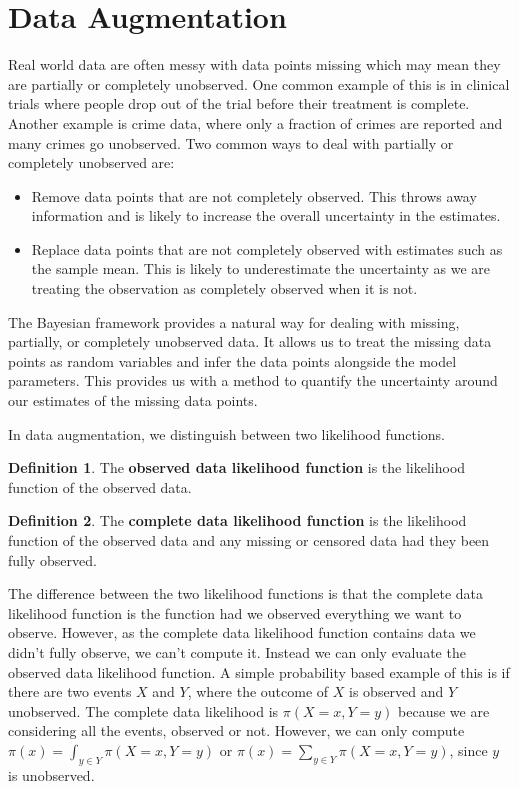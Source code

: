 \documentclass[
]{book}
\providecommand{\tightlist}{%
  \setlength{\itemsep}{0pt}\setlength{\parskip}{0pt}}
\theoremstyle{definition}
\newtheorem{definition}{Definition}[chapter]
\theoremstyle{definition}
\theoremstyle{definition}
\theoremstyle{definition}
\theoremstyle{remark}
\begin{document}
\section{Data Augmentation}\label{data-augmentation}

Real world data are often messy with data points missing which may mean they are partially or completely unobserved. One common example of this is in clinical trials where people drop out of the trial before their treatment is complete. Another example is crime data, where only a fraction of crimes are reported and many crimes go unobserved. Two common ways to deal with partially or completely unobserved are:

\begin{itemize}
\tightlist
\item
  Remove data points that are not completely observed. This throws away information and is likely to increase the overall uncertainty in the estimates.
\item
  Replace data points that are not completely observed with estimates such as the sample mean. This is likely to underestimate the uncertainty as we are treating the observation as completely observed when it is not.
\end{itemize}

The Bayesian framework provides a natural way for dealing with missing, partially, or completely unobserved data. It allows us to treat the missing data points as random variables and infer the data points alongside the model parameters. This provides us with a method to quantify the uncertainty around our estimates of the missing data points.

In data augmentation, we distinguish between two likelihood functions.

\begin{definition}
The \textbf{observed data likelihood function} is the likelihood function of the observed data.
\end{definition}

\begin{definition}
The \textbf{complete data likelihood function} is the likelihood function of the observed data and any missing or censored data had they been fully observed.
\end{definition}

The difference between the two likelihood functions is that the complete data likelihood function is the function had we observed everything we want to observe. However, as the complete data likelihood function contains data we didn't fully observe, we can't compute it. Instead we can only evaluate the observed data likelihood function. A simple probability based example of this is if there are two events \(X\) and \(Y\), where the outcome of \(X\) is observed and \(Y\) unobserved. The complete data likelihood is \(\pi(X = x, Y = y)\) because we are considering all the events, observed or not. However, we can only compute \(\pi(x) = \int_{y \in Y}\pi(X = x, Y = y)\) or \(\pi(x) = \sum_{y \in Y}\pi(X = x, Y = y)\), since \(y\) is unobserved.
\end{document}
